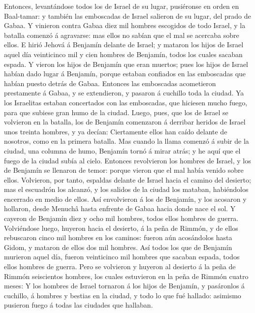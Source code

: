  Entonces, levantándose todos los de Israel de su lugar,
pusiéronse en orden en Baal-tamar: y también las emboscadas de Israel
salieron de su lugar, del prado de Gabaa.  Y vinieron
contra Gabaa diez mil hombres escogidos de todo Israel, y la batalla
comenzó á agravarse: mas ellos no sabían que el mal se acercaba sobre
ellos.  E hirió Jehová á Benjamín delante de Israel; y
mataron los hijos de Israel aquel día veinticinco mil y cien hombres de
Benjamín, todos los cuales sacaban espada.  Y vieron los
hijos de Benjamín que eran muertos; pues los hijos de Israel habían dado
lugar á Benjamín, porque estaban confiados en las emboscadas que habían
puesto detrás de Gabaa.  Entonces las emboscadas
acometieron prestamente á Gabaa, y se extendieron, y pasaron á cuchillo
toda la ciudad.  Ya los Israelitas estaban concertados
con las emboscadas, que hiciesen mucho fuego, para que subiese gran humo
de la ciudad.  Luego, pues, que los de Israel se
volvieron en la batalla, los de Benjamín comenzaron á derribar heridos
de Israel unos treinta hombres, y ya decían: Ciertamente ellos han caído
delante de nosotros, como en la primera batalla.  Mas
cuando la llama comenzó á subir de la ciudad, una columna de humo,
Benjamín tornó á mirar atrás; y he aquí que el fuego de la ciudad subía
al cielo.  Entonces revolvieron los hombres de Israel, y
los de Benjamín se llenaron de temor: porque vieron que el mal había
venido sobre ellos.  Volvieron, por tanto, espaldas
delante de Israel hacia el camino del desierto; mas el escuadrón los
alcanzó, y los salidos de la ciudad los mataban, habiéndolos encerrado
en medio de ellos.  Así envolvieron á los de Benjamín, y
los acosaron y hollaron, desde Menuchâ hasta enfrente de Gabaa hacia
donde nace el sol.  Y cayeron de Benjamín diez y ocho mil
hombres, todos ellos hombres de guerra.  Volviéndose
luego, huyeron hacia el desierto, á la peña de Rimmón, y de ellos
rebuscaron cinco mil hombres en los caminos: fueron aún acosándolos
hasta Gidom, y mataron de ellos dos mil hombres.  Así
todos los que de Benjamín murieron aquel día, fueron veinticinco mil
hombres que sacaban espada, todos ellos hombres de guerra.
 Pero se volvieron y huyeron al desierto á la peña de
Rimmón seiscientos hombres, los cuales estuvieron en la peña de Rimmón
cuatro meses:  Y los hombres de Israel tornaron á los
hijos de Benjamín, y pasáronlos á cuchillo, á hombres y bestias en la
ciudad, y todo lo que fué hallado: asimismo pusieron fuego á todas las
ciudades que hallaban.

